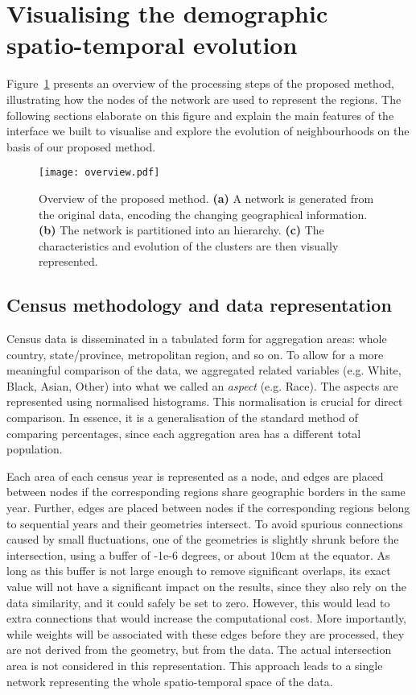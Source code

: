 \section{Visualising the demographic spatio-temporal evolution}
\label{sec:method}
Figure~\ref{fig:overview} presents an overview of the processing steps of the
proposed method, illustrating how the nodes of the network are used to represent
the regions. The following sections elaborate on this figure and explain the
main features of the interface we built to visualise and explore the evolution
of neighbourhoods on the basis of our proposed method.


\begin{figure}
    \centering 
    \texttt{[image: overview.pdf]}
    \caption{Overview of the proposed method. 
        \textbf{(a)} A network is generated from the original data,
        encoding the changing geographical information. 
        \textbf{(b)} The network is partitioned into an hierarchy. 
        \textbf{(c)} The characteristics and evolution of the clusters are then
        visually represented.
        \label{fig:overview}}
\end{figure}


\subsection{Census methodology and data representation}

Census data is disseminated in a tabulated form for aggregation areas: whole
country, state/province, metropolitan region, and so on. To allow for a more
meaningful comparison of the data, we aggregated related variables (e.g. White,
Black, Asian, Other) into what we called an \emph{aspect} (e.g. Race). The
aspects are represented using normalised histograms. This normalisation is
crucial for direct comparison. In essence, it is a generalisation of the
standard method of comparing percentages, since each aggregation area has a
different total population.

Each area of each census year is represented as a node, and edges are placed
between nodes if the corresponding regions share geographic borders in the same
year. Further, edges are placed between nodes if the corresponding regions
belong to sequential years and their geometries intersect. To avoid spurious
connections caused by small fluctuations, one of the geometries is slightly
shrunk before the intersection, using a buffer of -1e-6 degrees, or about 10cm
at the equator. As long as this buffer is not large enough to remove significant
overlaps, its exact value will not have a significant impact on the results,
since they also rely on the data similarity, and it could safely be set to zero.
However, this would lead to extra connections that would increase the
computational cost. More importantly, while weights will be associated with
these edges before they are processed, they are not derived from the geometry,
but from the data. The actual intersection area is not considered in this
representation.  This approach leads to a single network representing the whole
spatio-temporal space of the data. 


